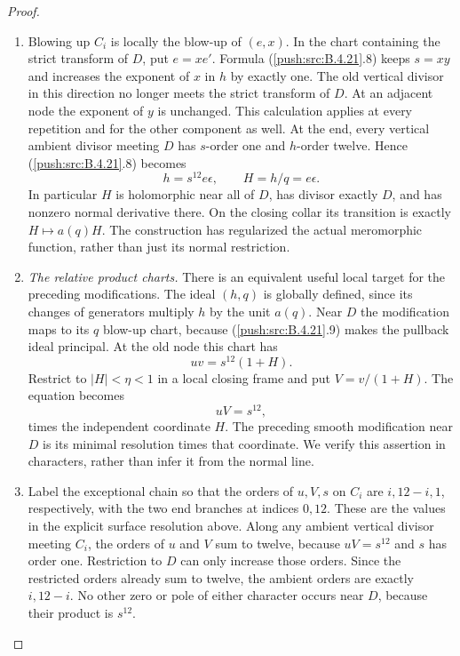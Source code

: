 \begin{proof}
\begin{enumerate}[label=\arabic*.,leftmargin=*]
\item Blowing up $C_i$ is locally the blow-up of $(e,x)$.
In the chart containing the strict transform of $D$, put
$e=xe'$.  Formula (\ref{push:src:B.4.21}.8) keeps $s=xy$ and increases
the exponent of $x$ in $h$ by exactly one.  The old vertical
divisor in this direction no longer meets the strict transform
of $D$.  At an adjacent node the exponent of $y$ is unchanged.
This calculation applies at every repetition and for the
other component as well.  At the end, every vertical ambient
divisor meeting $D$ has $s$-order one and $h$-order twelve.
Hence (\ref{push:src:B.4.21}.8) becomes
\[
 h=s^{12}e\epsilon,
 \qquad H=h/q=e\epsilon.
 \tag{B.4.21.9}
\]
In particular $H$ is holomorphic near all of $D$, has divisor
exactly $D$, and has nonzero normal derivative there.  On the
closing collar its transition is exactly $H\mapsto a(q)H$.
The construction has regularized the actual meromorphic
function, rather than just its normal restriction.

\item \emph{The relative product charts.}
There is an equivalent useful local target for the preceding
modifications.  The ideal $(h,q)$ is globally defined, since
its changes of generators multiply $h$ by the unit $a(q)$.
Near $D$ the modification maps to its $q$ blow-up chart,
because (\ref{push:src:B.4.21}.9) makes the pullback ideal principal.
At the old node this chart has
\[
 uv=s^{12}(1+H).
\]
Restrict to $|H|<\eta<1$ in a local closing frame and put
$V=v/(1+H)$.  The equation becomes
\[
 uV=s^{12},
\]
times the independent coordinate $H$.
The preceding smooth modification near $D$ is its minimal
resolution times that coordinate.  We verify this assertion
in characters, rather than infer it from the normal line.

\item Label the exceptional chain so that the orders of $u,V,s$
on $C_i$ are $i,12-i,1$, respectively, with the two end
branches at indices $0,12$.  These are the values in the
explicit surface resolution above.  Along any ambient vertical
divisor meeting $C_i$, the orders of $u$ and $V$ sum to twelve,
because $uV=s^{12}$ and $s$ has order one.  Restriction to
$D$ can only increase those orders.  Since the restricted
orders already sum to twelve, the ambient orders are exactly
$i,12-i$.  No other zero or pole of either character occurs
near $D$, because their product is $s^{12}$.


\end{enumerate}
\end{proof}
